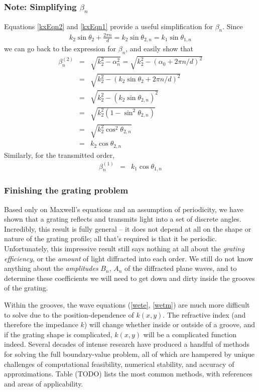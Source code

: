 \subsubsection{Note: Simplifying $\beta_n$}
Equations \ref{kxEqn2} and \ref{kxEqn1} provide a useful simplification for $\beta_n$.  Since 
\begin{eqnarray}
k_2 \sin \theta_2 +\frac{ 2\pi n}{d} = k_2 \sin \theta_{2,n} = k_1 \sin \theta_{1,n}
\end{eqnarray}
we can go back to the expression for $\beta_n$, and easily show that 
\begin{eqnarray}
\beta_n^{(2)} &=& \sqrt{k_2^2 - \alpha_n^2} = \sqrt{k_2^2 - (\alpha_0 +2\pi n/d)^2} \\
&=& \sqrt{k_2^2 - (k_2 \sin \theta_2 +2\pi n/d)^2}\\
&=& \sqrt{ k_2^2 - (k_2 \sin \theta_{2,n})^2 }\\
&=& \sqrt{ k_2^2 (1 - \sin^2 \theta_{2,n})}\\
&=& \sqrt{ k_2^2 \cos^2 \theta_{2,n} }\\
&=& k_2 \cos \theta_{2,n}
\end{eqnarray}
Similarly, for the transmitted order,
\begin{eqnarray}
\beta_n^{(1)} &=& k_1 \cos \theta_{1,n}
\end{eqnarray}

\subsubsection{Finishing the grating problem}
Based only on Maxwell's equations and an assumption of periodicity, we have shown that a grating reflects and transmits light into a set of discrete angles.  Incredibly, this result is fully general -- it does not depend at all on the shape or nature of the grating profile; all that's required is that it be periodic.  Unfortunately, this impressive result still says nothing at all about the \emph{grating efficiency}, or the \emph{amount} of light diffracted into each order.  We still do not know anything about the \emph{amplitudes} $B_n$, $A_n$ of the diffracted plane waves, and to determine these coefficients we will need to get down and dirty inside the grooves of the grating.

Within the grooves, the wave equations (\ref{wete}, \ref{wetm}) are much more difficult to solve due to the position-dependence of $k(x,y)$.  The refractive index (and therefore the impedance $k$) will change whether inside or outside of a groove, and if the grating shape is complicated, $k(x,y)$ will be a complicated function indeed.  Several decades of intense research have produced a handful of methods for solving the full boundary-value problem, all of which are hampered by unique challenges of computational feasibility, numerical stability, and accuracy of approximations.  Table (TODO) lists the most common methods, with references and areas of applicability.   

